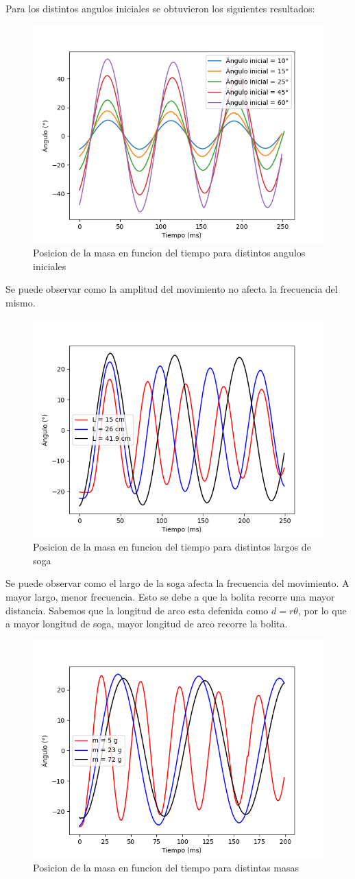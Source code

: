 \documentclass[12pt,a4]{article}
\begin{document}
Para los distintos angulos iniciales se obtuvieron los siguientes resultados:

\begin{figure}[H]
    \centering
    \includegraphics[width=0.6\linewidth]{angulos.png}
    \caption{Posicion de la masa en funcion del tiempo para distintos angulos iniciales}
    \label{fig:angulos}
\end{figure}

Se puede observar como la amplitud del movimiento no afecta la frecuencia del mismo. 

\begin{figure}[H]
    \centering
    \includegraphics[width=0.6\linewidth]{largo.png}
    \caption{Posicion de la masa en funcion del tiempo para distintos largos de soga}
    \label{fig:largo}
\end{figure}

Se puede observar como el largo de la soga afecta la frecuencia del movimiento. A mayor largo, menor frecuencia. Esto se debe a que la bolita recorre una mayor distancia. Sabemos que la longitud de arco esta defenida como $d = r \theta$, por lo que a mayor longitud de soga, mayor longitud de arco recorre la bolita.

\begin{figure}[H]
    \centering
    \includegraphics[width=0.6\linewidth]{peso.png}
    \caption{Posicion de la masa en funcion del tiempo para distintas masas}
    \label{fig:masa}
\end{figure}
\end{document}
